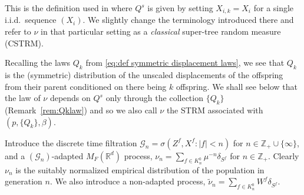 \documentclass[12pt]{article}
\numberwithin{theorem}{section}
\theoremstyle{def}
\numberwithin{equation}{section}
\newcommand{\R}{\mathbb{R}}
\newcommand{\Z}{\mathbb{Z}}
\newcommand{\cG}{\mathcal G}
\begin{document}
 This is the definition used in \cite{ADHP} where $Q^s$ is given by setting $X_{i,k}=X_i$ for a single i.i.d.\ sequence $(X_i)$. 
 We slightly change  the terminology introduced there and refer to $\nu$ in that particular setting as a \emph{classical} super-tree random measure (CSTRM).  

Recalling the laws $Q_k$ from \eqref{eq:def symmetric displacement laws}, we see that $Q_k$ is the (symmetric) distribution of the unscaled displacements of the offspring from their parent conditioned on there being $k$ offspring. We shall see below that the law of $\nu$ depends on $Q^s$ only through the collection $\{Q_k\}$ (Remark~\ref{rem:Qklaw}) and so we also call $\nu$ the STRM associated with $(p,\{Q_k\},\beta)$.

Introduce the discrete time filtration $\cG_n=\sigma(Z^f,X^f:|f|<n)$ for $n\in\Z_+\cup\{\infty\}$, and a $(\cG_n)$-adapted $M_F(\R^d)$ process, $\nu_n=\sum_{f\in K_n^0}\mu^{-n}\delta_{S^f}$ for $n\in\Z_+$. Clearly $\nu_n$ is the suitably normalized empirical distribution of the population in generation $n$. We also introduce a non-adapted process, $\tilde \nu_n=\sum_{f\in K^0_n}W^f\delta_{S^f}$. 
\end{document}
